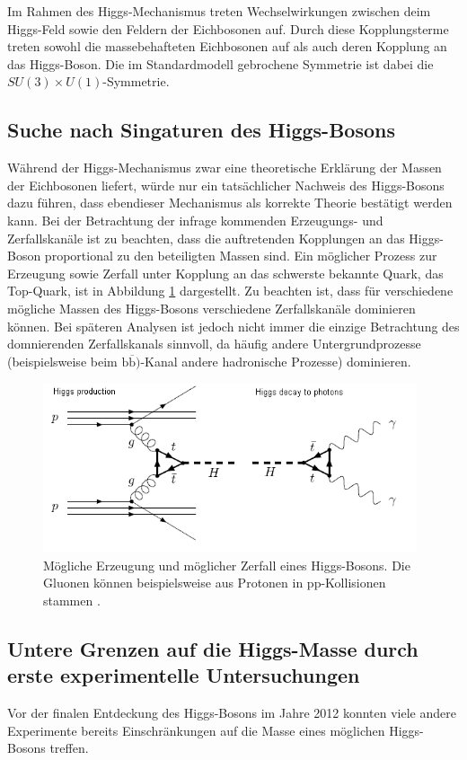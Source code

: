 Im Rahmen des Higgs-Mechanismus treten Wechselwirkungen zwischen deim Higgs-Feld sowie den Feldern der Eichbosonen auf.
Durch diese Kopplungsterme treten sowohl die massebehafteten Eichbosonen auf als auch deren Kopplung an das Higgs-Boson.
Die im Standardmodell gebrochene Symmetrie ist dabei die $SU(3) \times U(1)$-Symmetrie.

\subsection{Suche nach Singaturen des Higgs-Bosons}
Während der Higgs-Mechanismus zwar eine theoretische Erklärung der Massen der Eichbosonen liefert, würde nur ein tatsächlicher Nachweis des Higgs-Bosons dazu führen, dass ebendieser Mechanismus als korrekte Theorie bestätigt werden kann.
Bei der Betrachtung der infrage kommenden Erzeugungs- und Zerfallskanäle ist zu beachten, dass die auftretenden Kopplungen an das Higgs-Boson proportional zu den beteiligten Massen sind.
Ein möglicher Prozess zur Erzeugung sowie Zerfall unter Kopplung an das schwerste bekannte Quark, das Top-Quark, ist in Abbildung \ref{fig:higgs2} dargestellt.
Zu beachten ist, dass für verschiedene mögliche Massen des Higgs-Bosons verschiedene Zerfallskanäle dominieren können.
Bei späteren Analysen ist jedoch nicht immer die einzige Betrachtung des domnierenden Zerfallskanals sinnvoll, da häufig andere Untergrundprozesse (beispielsweise beim $\text{b}\overline{\text{b}})$-Kanal andere hadronische Prozesse) dominieren.

\begin{figure}
  \centering
  \includegraphics[height=5.0cm]{ressources/higgsfeyn.png}
  \caption{Mögliche Erzeugung und möglicher Zerfall eines Higgs-Bosons. Die Gluonen können beispielsweise aus Protonen in pp-Kollisionen stammen \cite{higgs_production_decay}.}
  \label{fig:higgs2}
\end{figure}

\subsection{Untere Grenzen auf die Higgs-Masse durch erste experimentelle Untersuchungen}
Vor der finalen Entdeckung des Higgs-Bosons im Jahre 2012 konnten viele andere Experimente bereits Einschränkungen auf die Masse eines möglichen Higgs-Bosons treffen.

